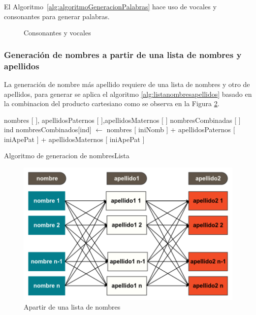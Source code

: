 El Algoritmo~\ref{alg:algoritmoGeneracionPalabras} hace uso de vocales y consonantes para generar palabras.
\begin{figure}[H]
\centering
{}
\caption{Consonantes y vocales} \label{fig:consonantes y vocales}
\end{figure}
\subsubsection{Generaci\'on de nombres a partir de una lista de nombres y apellidos}
La generaci\'on de nombre m\'as apellido requiere de una lista de nombres y otro de apellidos, para generar se aplica el algoritmo \ref{alg:listanombresapellidos} basado en la combinacion del producto cartesiano como se observa en la Figura  \ref{fig:listNameLastName}.
\begin{algorithm}[H]
\begin{algorithmic}[1]
\REQUIRE nombres $[$ $]$, apellidosPaternos $[$ $]$,apellidosMaternos $[$ $]$ 
\STATE nombresCombinadas $[$ $]$
\STATE ind
\STATE nombresCombinados$[$ind$]$ $\leftarrow$ nombres $[$ iniNomb $]$ + apellidosPaternos $[$ iniApePat $]$ + apellidosMaternos $[$ iniApePat $]$
\ENDFOR
\ENDFOR 
\ENDFOR
\RETURN \TRUE
\end{algorithmic}
\caption{Algoritmo de generacion de nombresLista}\label{alg:listanombresapellidos}
\end{algorithm}

\begin{figure}[H]
\centering
\includegraphics[scale=0.4]{images/listNameApe1Ape2.png}
\caption{Apartir de una lista de nombres}\label{fig:listNameLastName}
\end{figure}

